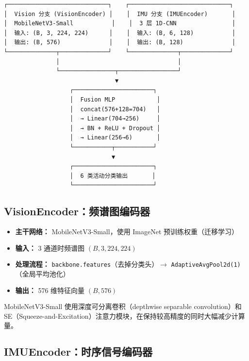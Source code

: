 \documentclass[12pt,a4paper]{ctexart}
\newcommand{\code}[1]{\texttt{#1}}
\begin{document}
\begin{verbatim}
┌─────────────────────────────┐    ┌─────────────────────────────┐
│  Vision 分支 (VisionEncoder) │    │  IMU 分支 (IMUEncoder)       │
│  MobileNetV3-Small           │    │  3 层 1D-CNN                │
│  输入: (B, 3, 224, 224)      │    │  输入: (B, 6, 128)           │
│  输出: (B, 576)              │    │  输出: (B, 128)              │
└──────────────┬──────────────┘    └──────────────┬──────────────┘
               │                                  │
               └────────────────┬─────────────────┘
                                ▼
                   ┌───────────────────────┐
                   │  Fusion MLP            │
                   │  concat(576+128=704)   │
                   │  → Linear(704→256)     │
                   │  → BN + ReLU + Dropout │
                   │  → Linear(256→6)       │
                   └───────────┬───────────┘
                               ▼
                   ┌───────────────────────┐
                   │  6 类活动分类输出       │
                   └───────────────────────┘
\end{verbatim}

\subsection{VisionEncoder：频谱图编码器}

\begin{itemize}
    \item \textbf{主干网络：} MobileNetV3-Small，使用 ImageNet 预训练权重（迁移学习）
    \item \textbf{输入：} 3 通道时频谱图 $(B, 3, 224, 224)$
    \item \textbf{处理流程：} \code{backbone.features}（去掉分类头）$\rightarrow$ \code{AdaptiveAvgPool2d(1)}（全局平均池化）
    \item \textbf{输出：} 576 维特征向量 $(B, 576)$
\end{itemize}

MobileNetV3-Small 使用深度可分离卷积（depthwise separable convolution）和 SE（Squeeze-and-Excitation）注意力模块，在保持较高精度的同时大幅减少计算量。

\subsection{IMUEncoder：时序信号编码器}
\end{document}
